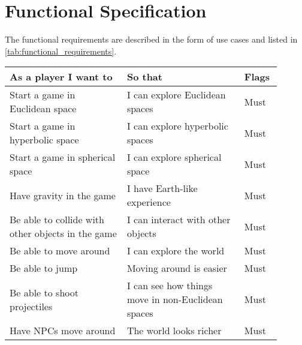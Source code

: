 \chapter{Functional Specification}\label{ch:functional_specification}
The functional requirements are described in the form of use cases and listed in \autoref{tab:functional_requirements}.

\begin{table}[h]
    \begin{tabular}{|p{0.4\linewidth}|p{0.4\linewidth}|p{0.1\linewidth}|}
        \hline
        \textbf{As a player I want to}                             & \textbf{So that}                                                   & \textbf{Flags} \\
        \hline
        Start a game in Euclidean space                            & I can explore Euclidean spaces                                     & Must           \\
        Start a game in hyperbolic space                           & I can explore hyperbolic spaces                                    & Must           \\
        Start a game in spherical space                            & I can explore spherical space                                      & Must           \\
        Have gravity in the game                                   & I have Earth-like experience                                       & Must           \\
        Be able to collide with other objects in the game          & I can interact with other objects                                  & Must           \\
        Be able to move around                                     & I can explore the world                                            & Must           \\
        Be able to jump                                            & Moving around is easier                                            & Must           \\
        Be able to shoot projectiles                               & I can see how things move in non-Euclidean spaces                  & Must           \\
        Have NPCs move around                                      & The world looks richer                                             & Must           \\

\end{tabular}
\end{table}
